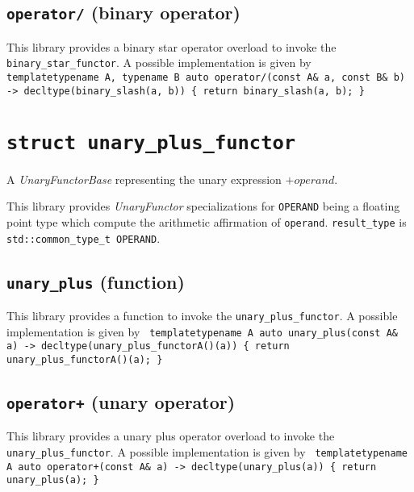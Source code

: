 \documentclass[oneside]{book}
\begin{document}
\subsection{\texttt{operator/} (binary operator)}
This library provides a binary star operator overload to invoke the \texttt{binary\_star\_functor}.
A possible implementation is given by\newline
\texttt{
template\textlangle typename A, typename B\textrangle\newline
auto operator/(const A\& a, const B\& b) -> decltype(binary\_slash(a, b))\newline
\{ return binary\_slash(a, b); \}
}

\section{\texttt{struct unary\_plus\_functor}}
A \textit{UnaryFunctorBase} representing the unary expression $+\textit{operand}$.\newline

\noindent{}This library provides \textit{UnaryFunctor}            specializations for
\texttt{OPERAND} being a floating point type which compute the arithmetic affirmation
of \texttt{operand}. \texttt{result\_type} is \texttt{std::common\_type\_t\textlangle
OPERAND\textrangle}.

\subsection{\texttt{unary\_plus} (function)}
This library provides a function to invoke the \texttt{unary\_plus\_functor}.
A possible implementation is given by\newline
\texttt{
template\textlangle typename A\textrangle\newline
auto unary\_plus(const A\& a) -> decltype(unary\_plus\_functor\textlangle A\textrangle()(a))\newline
\{ return unary\_plus\_functor\textlangle A\textrangle()(a); \}
}

\subsection{\texttt{operator+} (unary operator)}
This library provides a unary plus operator overload to invoke the \texttt{unary\_plus\_functor}.
A possible implementation is given by\newline
\texttt{
template\textlangle typename A\textrangle\newline
auto operator+(const A\& a) -> decltype(unary\_plus(a))\newline
\{ return unary\_plus(a); \}
}
\end{document}
